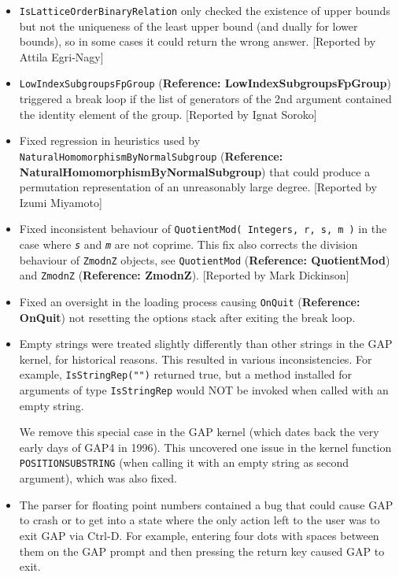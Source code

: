 \documentclass[a4paper,11pt]{report}
\begin{document}
{{{\begin{itemize}
as before in some rare cases. 
\item   \texttt{IsLatticeOrderBinaryRelation} only checked the existence of upper bounds but not the uniqueness of the least
upper bound (and dually for lower bounds), so in some cases it could return
the wrong answer. [Reported by Attila Egri-Nagy] 
\item   \texttt{LowIndexSubgroupsFpGroup} (\textbf{Reference: LowIndexSubgroupsFpGroup}) triggered a break loop if the list of generators of the 2nd argument contained
the identity element of the group. [Reported by Ignat Soroko] 
\item   Fixed regression in heuristics used by \texttt{NaturalHomomorphismByNormalSubgroup} (\textbf{Reference: NaturalHomomorphismByNormalSubgroup}) that could produce a permutation representation of an unreasonably large
degree. [Reported by Izumi Miyamoto] 
\item   Fixed inconsistent behaviour of \texttt{QuotientMod( Integers, r, s, m )} in the case where \mbox{\texttt{\mdseries\slshape s}} and \mbox{\texttt{\mdseries\slshape m}} are not coprime. This fix also corrects the division behaviour of \texttt{ZmodnZ} objects, see \texttt{QuotientMod} (\textbf{Reference: QuotientMod}) and \texttt{ZmodnZ} (\textbf{Reference: ZmodnZ}). [Reported by Mark Dickinson] 
\item   Fixed an oversight in the loading process causing \texttt{OnQuit} (\textbf{Reference: OnQuit}) not resetting the options stack after exiting the break loop. 
\item   Empty strings were treated slightly differently than other strings in the \textsf{GAP} kernel, for historical reasons. This resulted in various inconsistencies. For
example, \texttt{IsStringRep("")} returned true, but a method installed for arguments of type \texttt{IsStringRep} would NOT be invoked when called with an empty string. 

 We remove this special case in the \textsf{GAP} kernel (which dates back the very early days of \textsf{GAP}{\nobreakspace}4 in 1996). This uncovered one issue in the kernel function \texttt{POSITION{\textunderscore}SUBSTRING} (when calling it with an empty string as second argument), which was also
fixed. 
\item   The parser for floating point numbers contained a bug that could cause \textsf{GAP} to crash or to get into a state where the only action left to the user was to
exit \textsf{GAP} via Ctrl-D. For example, entering four dots with spaces between them on the \textsf{GAP} prompt and then pressing the return key caused \textsf{GAP} to exit. 


\end{itemize}}}}
\end{document}
